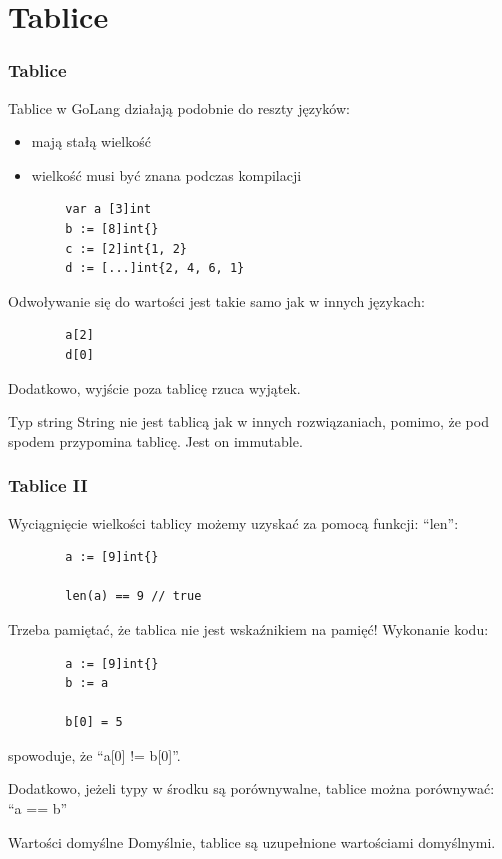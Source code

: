 \documentclass[10pt]{beamer}
\newcommand{\quotes}[1]{``#1''}
\begin{document}

\section[Tablice]{Tablice}
\begin{frame}[fragile]
    \frametitle{Tablice}
    Tablice w GoLang działają podobnie do reszty języków:
    \begin{itemize}
        \item mają stałą wielkość
        \item wielkość musi być znana podczas kompilacji
    \end{itemize}

    \begin{verbatim}
        var a [3]int
        b := [8]int{}
        c := [2]int{1, 2}
        d := [...]int{2, 4, 6, 1}
    \end{verbatim}

    Odwoływanie się do wartości jest takie samo jak w innych językach:

    \begin{verbatim}
        a[2]
        d[0]
    \end{verbatim}
    Dodatkowo, wyjście poza tablicę rzuca wyjątek.

    \begin{block}{Typ string}
        String nie jest tablicą jak w innych rozwiązaniach, pomimo, że pod spodem
        przypomina tablicę. Jest on immutable.
    \end{block}
\end{frame}


\begin{frame}[fragile]
    \frametitle{Tablice II}
    Wyciągnięcie wielkości tablicy możemy uzyskać za pomocą funkcji: \quotes{len}:
    \begin{verbatim}
        a := [9]int{}

        len(a) == 9 // true
    \end{verbatim}

    Trzeba pamiętać, że tablica nie jest wskaźnikiem na pamięć! Wykonanie kodu:
    \begin{verbatim}
        a := [9]int{}
        b := a

        b[0] = 5
    \end{verbatim}
    spowoduje, że \quotes{a[0] != b[0]}.

    Dodatkowo, jeżeli typy w środku są porównywalne, tablice można porównywać:
    \quotes{a == b}

    \begin{block}{Wartości domyślne}
        Domyślnie, tablice są uzupełnione wartościami domyślnymi.
    \end{block}
\end{frame}
\end{document}
